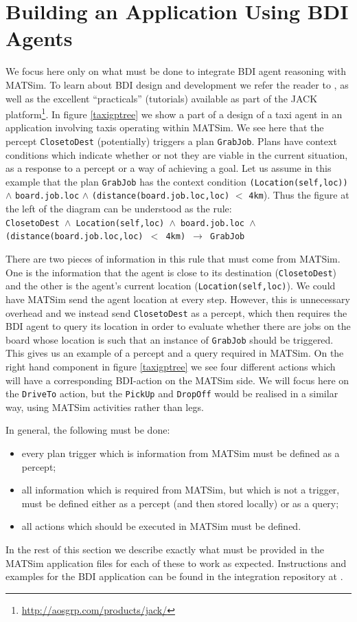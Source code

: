 \section{Building an Application Using BDI Agents}
\label{sec:bdi-usage}
We focus here only on what must be done to integrate  BDI agent
reasoning with MATSim. To learn about BDI design and development we
refer the reader to \cite{prometheusbook}, as well as the excellent
``practicals'' (tutorials) available as part of the JACK
platform\footnote{\url{http://aosgrp.com/products/jack/}}. In figure
\ref{taxigptree} we show a part of a  
design of a taxi agent in an application involving taxis operating
within MATSim. We see here that the percept \texttt{ClosetoDest}
(potentially) triggers a plan \texttt{GrabJob}. Plans have context
conditions which indicate whether or not they are viable in the
current situation, as a response to a percept or a way of achieving a
goal. Let us assume in this example that the plan \texttt{GrabJob} has
the context condition \texttt{(Location(self,loc))} 
$\wedge$ \texttt{board.job.loc} $\wedge$
\texttt{(distance(board.job.loc,loc)} $<$
\texttt{4km}). Thus the figure at the left of the diagram can be
understood as the rule: \\
\texttt{ClosetoDest $\wedge$ 
Location(self,loc) $\wedge$
  board.job.loc $\wedge$
  (distance(board.job.loc,loc) $<$ 4km)
$\rightarrow$
  GrabJob} 

There are two pieces of information in this rule that must come from
MATSim. One is the information that the agent is close to its
destination (\texttt{ClosetoDest}) and the other is the agent's
current location (\texttt{Location(self,loc)}).  We could have MATSim
send the agent location at every step. However, this is unnecessary
overhead and we instead send \texttt{ClosetoDest} as a percept, which
then requires the BDI agent to query its location in order to evaluate
whether there are jobs on the board whose location is such that an
instance of \texttt{GrabJob} should be triggered.  This gives us an
example of a percept and a query required in MATSim. On the right hand
component in figure \ref{taxigptree} we see four different actions
which will have a corresponding BDI-action on the MATSim side. We will
focus here on the \texttt{DriveTo} action, but the \texttt{PickUp} and
\texttt{DropOff} would be realised in a similar way, using MATSim
activities rather than legs.

In general, the following must be done:
\begin{itemize}\styleItemize
\item every plan trigger which is information from MATSim must
be defined as a percept; 
\item all information which is required from
MATSim, but which is not a trigger, must be defined either as a
percept (and then stored locally) or as a query; 
\item all actions which should be executed in MATSim must be defined.
\end{itemize}
%
In the rest of this section we describe exactly what must be provided
in the MATSim application files for each of these to work as
expected. Instructions and examples for the BDI application can be
found in the integration repository at \url{}.

